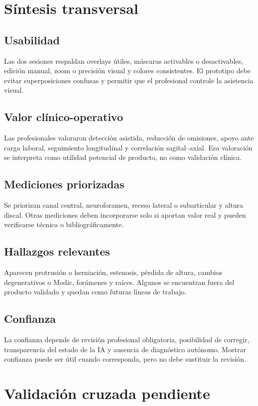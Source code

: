\section{Síntesis transversal}
\label{anexo:h-sintesis-transversal}

\subsection*{Usabilidad}
Las dos sesiones respaldan overlays útiles, máscaras activables o desactivables, edición manual, zoom o precisión visual y colores consistentes. El prototipo debe evitar superposiciones confusas y permitir que el profesional controle la asistencia visual.

\subsection*{Valor clínico-operativo}
Las profesionales valoraron detección asistida, reducción de omisiones, apoyo ante carga laboral, seguimiento longitudinal y correlación sagital--axial. Esa valoración se interpreta como utilidad potencial de producto, no como validación clínica.

\subsection*{Mediciones priorizadas}
Se priorizan canal central, neuroforamen, receso lateral o subarticular y altura discal. Otras mediciones deben incorporarse solo si aportan valor real y pueden verificarse técnica o bibliográficamente.

\subsection*{Hallazgos relevantes}
Aparecen protrusión o herniación, estenosis, pérdida de altura, cambios degenerativos o Modic, forámenes y raíces. Algunos se encuentran fuera del producto validado y quedan como futuras líneas de trabajo.

\subsection*{Confianza}
La confianza depende de revisión profesional obligatoria, posibilidad de corregir, transparencia del estado de la IA y ausencia de diagnóstico autónomo. Mostrar confianza puede ser útil cuando corresponda, pero no debe sustituir la revisión.

\section{Validación cruzada pendiente}
\label{anexo:h-validacion-cruzada-pendiente}

